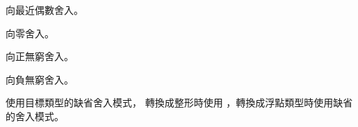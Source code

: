 \startCLOD[修飾符][舍入模式描述]

{向最近偶數舍入。}

{向零舍入。}

{向正無窮舍入。}

{向負無窮舍入。}

{使用目標類型的缺省舍入模式，
轉換成整形時使用 ，轉換成浮點類型時使用缺省的舍入模式。}

\stopCLOD

